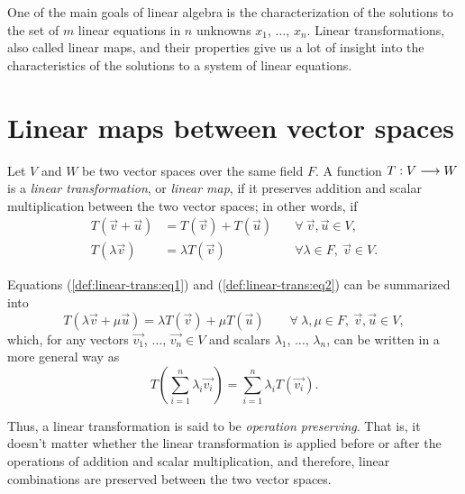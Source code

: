 
One of the main goals of linear algebra is the characterization of the solutions to the set of $m$
linear equations in $n$ unknowns $x_1$, $\ldots$, $x_n$. Linear transformations, also called linear maps,
and their properties give us a lot of insight into the characteristics of the solutions to a system of
linear equations.

\section{Linear maps between vector spaces}


\begin{defn}
    Let $V$ and $W$ be two vector spaces over the same field $F$. A function $T : V\longrightarrow W$ is a
    \textit{linear transformation}, or \textit{linear map}, if it preserves addition and scalar multiplication
    between the two vector spaces; in other words, if
    \begin{align}\label{def:linear-trans:eq1}
        T\left( \vec{v} + \vec{u} \right) &= T\left( \vec{v} \right) + T\left( \vec{u} \right) \quad
                                          &\forall\ \vec{v}, \vec{u}\in V, \\
        T\left( \lambda\vec{v} \right) &= \lambda T\left( \vec{v} \right) \quad &\forall \lambda\in
        F,\ \vec{v}\in V. \label{def:linear-trans:eq2}
    \end{align}
\end{defn}

\noindent Equations (\ref{def:linear-trans:eq1}) and (\ref{def:linear-trans:eq2}) can be summarized into
\begin{equation}
    T\left( \lambda\vec{v} + \mu\vec{u} \right) = \lambda T\left( \vec{v} \right) + \mu T\left( \vec{u}\right)
    \quad\quad \forall\ \lambda, \mu\in F,\ \vec{v}, \vec{u}\in V,
\end{equation}
which, for any vectors $\vec{v_1}$, $\ldots$, $\vec{v_n}\in V$ and scalars $\lambda_1$, $\ldots$, $\lambda_n$, can be written in a more general way as
\begin{equation}
    T\left( \sum_{i=1}^n \lambda_i\vec{v_i}\right) = \sum_{i=1}^n \lambda_i T\left( \vec{v_i} \right).
\end{equation}

\noindent Thus, a linear transformation is said to be \textit{operation preserving}. That is, it doesn't matter
whether the linear transformation is applied before or after the operations of addition and scalar
multiplication, and therefore, linear combinations are preserved between the two vector spaces.

